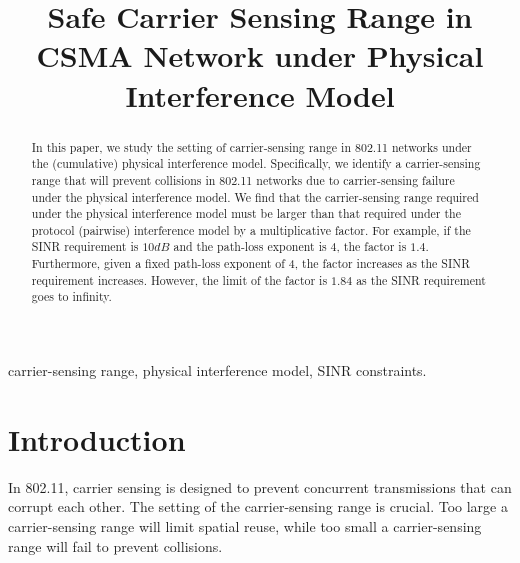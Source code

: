 \documentclass[conference]{IEEEtran}
\begin{document}
\title{Safe Carrier Sensing Range in CSMA Network under Physical Interference Model}

\author{

}

\maketitle

\begin{abstract}

In this paper, we study the setting of carrier-sensing range in
802.11 networks under the (cumulative) physical interference model.
Specif\/ically, we identify a carrier-sensing range that will
prevent collisions in 802.11 networks due to carrier-sensing failure
under the physical interference model. We f\/ind that the
carrier-sensing range required under the physical interference model
must be larger than that required under the protocol (pairwise)
interference model by a multiplicative factor. For example, if the
SINR requirement is $10dB$ and the path-loss exponent is $4$, the
factor is $1.4$. Furthermore, given a fixed path-loss exponent of 4,
the factor increases as the SINR requirement increases. However, the
limit of the factor is $1.84$ as the SINR requirement goes to
infinity.
\end{abstract}

\begin{keywords}
carrier-sensing range, physical interference model, SINR
constraints.
\end{keywords}


\IEEEpeerreviewmaketitle

\section{Introduction}

In 802.11, carrier sensing is designed to prevent concurrent
transmissions that can corrupt each other. The setting of the
carrier-sensing range is crucial. Too large a carrier-sensing range
will limit spatial reuse, while too small a carrier-sensing range
will fail to prevent collisions.
\end{document}
